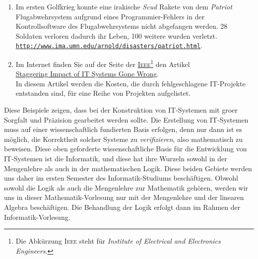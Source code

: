 \begin{enumerate}
\begin{enumerate}
            Einen detaillierten Bericht \"{u}ber diese Unf\"{a}lle finden Sie unter \\[0.2cm]
            \hspace*{0.5cm} 
            \href{http://courses.cs.vt.edu/~cs3604/lib/Therac_25/Therac\_1.html}{\texttt{http://courses.cs.vt.edu/cs3604/lib/Therac\_25/Therac\_1.html}}.
      \item Im ersten Golfkrieg konnte eine irakische \textsl{Scud} Rakete von dem \textsl{Patriot}
            Flugabwehrsystem aufgrund eines Programmier-Fehlers in der Kontrollsoftware des Flugabwehrsystems
            nicht abgefangen werden.  28 Soldaten verloren dadurch ihr Leben, 100 weitere wurden
            verletzt. \\[0.2cm]
            \hspace*{0.5cm} 
            \href{http://www.ima.umn.edu/~arnold/disasters/patriot.html}{\texttt{http://www.ima.umn.edu/arnold/disasters/patriot.html}}.
      \item Im Internet finden Sie auf der Seite der
            \href{https://de.wikipedia.org/wiki/Institute_of_Electrical_and_Electronics_Engineers}{\textsc{Ieee}}\footnote{
              Die Abk\"{u}rzung \textsc{Ieee} steht f\"{u}r \emph{Institute of Electrical and Electronics Engineers}.}
            den Artikel   
            \\[0.2cm]
            \hspace*{0.5cm}
            \href{http://spectrum.ieee.org/static/the-staggering-impact-of-it-systems-gone-wrong}{Staggering Impact of IT Systems Gone Wrong}.
            \\[0.2cm]
            In diesem Artikel werden die Kosten, die durch fehlgeschlagene IT-Projekte entstanden sind, f\"{u}r eine Reihe von Projekten aufgelistet.
      \end{enumerate}
      Diese Beispiele zeigen, dass bei der Konstruktion von IT-Systemen mit gro\3er Sorgfalt
      und Pr\"{a}zision gearbeitet werden sollte.  Die Erstellung von IT-Systemen muss auf einer 
      wissenschaftlich fundierten Basis erfolgen, denn nur dann ist es m\"{o}glich, die Korrektheit
      solcher Systeme zu \emph{verifizieren}, also mathematisch zu beweisen.
      Diese oben geforderte wissenschaftliche Basis f\"{u}r die Entwicklung von IT-Systemen ist die Informatik, 
      und diese hat ihre Wurzeln sowohl in der Mengenlehre als auch in der mathematischen
      Logik.  Diese beiden Gebiete werden uns daher im ersten Semester
      des Informatik-Studiums besch\"{a}ftigen.  Obwohl sowohl die Logik als auch die Mengenlehre zur
      Mathematik geh\"{o}ren, werden wir uns in dieser Mathematik-Vorlesung nur mit der Mengenlehre und
      der linearen Algebra besch\"{a}ftigen.  Die Behandlung der Logik erfolgt dann im Rahmen der
      Informatik-Vorlesung. 
\end{enumerate}

